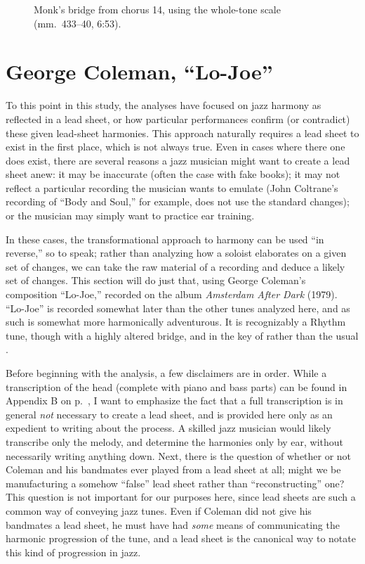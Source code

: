 \begin{figure}[tbp]
  \caption[Monk's bridge from chorus 14, using the whole-tone scale.]{%
    Monk's bridge from chorus 14, using the whole-tone scale (mm.~433--40, 6:53).}
  \label{ran:monk-wt-bridge}
\end{figure}



\section{George Coleman, “Lo-Joe”}
\label{sec:lo-joe}

To this point in this study, the analyses have focused on jazz harmony as
reflected in a lead sheet, or how particular performances confirm (or
contradict) these given lead-sheet harmonies. This approach naturally requires
a lead sheet to exist in the first place, which is not always true. Even in
cases where there one does exist, there are several reasons a jazz musician
might want to create a lead sheet anew: it may be inaccurate (often the case
with fake books); it may not reflect a particular recording the musician wants
to emulate (John Coltrane's recording of ``Body and Soul,'' for example, does
not use the standard changes); or the musician may simply want to practice ear
training.

In these cases, the transformational approach to harmony can be used ``in
reverse,'' so to speak; rather than analyzing how a soloist elaborates on a
given set of changes, we can take the raw material of a recording and deduce a
likely set of changes. This section will do just that, using George Coleman's
composition ``Lo-Joe,'' recorded on the album \emph{Amsterdam After Dark}
(1979). ``Lo-Joe'' is recorded somewhat later than the other tunes
analyzed here, and as such is somewhat more harmonically adventurous. It is
recognizably a Rhythm tune, though with a highly altered bridge, and in the
key of \Dflat rather than the usual \Bflat.

Before beginning with the analysis, a few disclaimers are in order. While a
transcription of the head (complete with piano and bass parts) can be found in
Appendix B on p.~\pageref{transcription:lo-joe}, I want to emphasize the fact
that a full transcription is in general \emph{not} necessary to create a lead
sheet, and is provided here only as an expedient to writing about the process.
A skilled jazz musician would likely transcribe only the melody, and determine
the harmonies only by ear, without necessarily writing anything down. Next,
there is the question of whether or not Coleman and his bandmates ever played
from a lead sheet at all; might we be manufacturing a somehow ``false'' lead
sheet rather than ``reconstructing'' one? This question is not important for
our purposes here, since lead sheets are such a common way of conveying jazz
tunes. Even if Coleman did not give his bandmates a lead sheet, he must have
had \emph{some} means of communicating the harmonic progression of the tune,
and a lead sheet is the canonical way to notate this kind of progression in
jazz.

